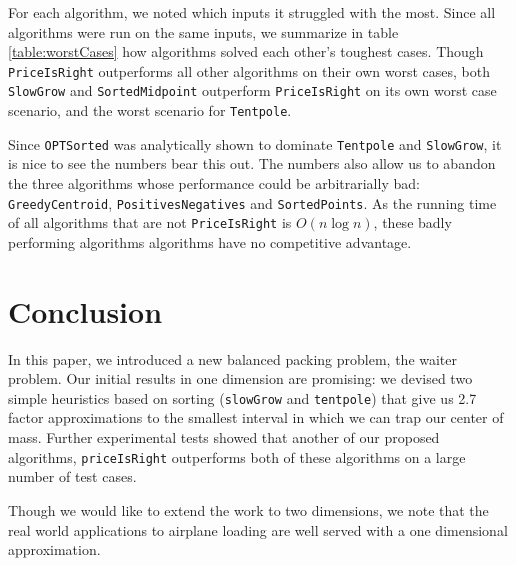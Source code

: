 For each algorithm, we noted which inputs it struggled with the most.  Since all algorithms were run on the same inputs, we summarize in table \ref{table:worstCases} how algorithms solved each other's toughest cases.  Though \texttt{PriceIsRight} outperforms all other algorithms on their own worst cases, both \texttt{SlowGrow} and \texttt{SortedMidpoint} outperform \texttt{PriceIsRight} on its own worst case scenario, and the worst scenario for \texttt{Tentpole}.

Since \texttt{OPTSorted} was analytically shown to dominate \texttt{Tentpole} and \texttt{SlowGrow}, it is nice to see the numbers bear this out.  The numbers also allow us to abandon the three algorithms whose performance could be arbitrarially bad: \texttt{GreedyCentroid}, \texttt{PositivesNegatives} and \texttt{SortedPoints}.  As the running time of all algorithms that are not \texttt{PriceIsRight} is $O(n \log n)$, these badly performing algorithms algorithms have no competitive advantage.


\section{Conclusion}

In this paper, we introduced a new balanced packing problem, the waiter problem.  Our initial results in one dimension are promising: we devised two simple heuristics based on sorting (\texttt{slowGrow} and \texttt{tentpole}) that give us 2.7 factor approximations to the smallest interval in which we can trap our center of mass.  Further experimental tests showed that another of our proposed algorithms, \texttt{priceIsRight} outperforms both of these algorithms on a large number of test cases.

Though we would like to extend the work to two dimensions, we note that the real world applications to airplane loading are well served with a one dimensional approximation.  

